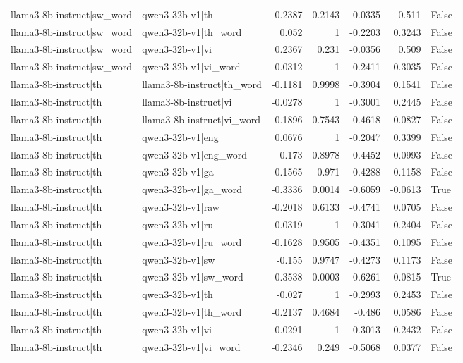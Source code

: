 \begin{table}
\begin{tabular}{l l r r r r l}
llama3-8b-instruct|sw_word & qwen3-32b-v1|th & 0.2387 & 0.2143 & -0.0335 & 0.511 & False \\
llama3-8b-instruct|sw_word & qwen3-32b-v1|th_word & 0.052 & 1 & -0.2203 & 0.3243 & False \\
llama3-8b-instruct|sw_word & qwen3-32b-v1|vi & 0.2367 & 0.231 & -0.0356 & 0.509 & False \\
llama3-8b-instruct|sw_word & qwen3-32b-v1|vi_word & 0.0312 & 1 & -0.2411 & 0.3035 & False \\
llama3-8b-instruct|th & llama3-8b-instruct|th_word & -0.1181 & 0.9998 & -0.3904 & 0.1541 & False \\
llama3-8b-instruct|th & llama3-8b-instruct|vi & -0.0278 & 1 & -0.3001 & 0.2445 & False \\
llama3-8b-instruct|th & llama3-8b-instruct|vi_word & -0.1896 & 0.7543 & -0.4618 & 0.0827 & False \\
llama3-8b-instruct|th & qwen3-32b-v1|eng & 0.0676 & 1 & -0.2047 & 0.3399 & False \\
llama3-8b-instruct|th & qwen3-32b-v1|eng_word & -0.173 & 0.8978 & -0.4452 & 0.0993 & False \\
llama3-8b-instruct|th & qwen3-32b-v1|ga & -0.1565 & 0.971 & -0.4288 & 0.1158 & False \\
llama3-8b-instruct|th & qwen3-32b-v1|ga_word & -0.3336 & 0.0014 & -0.6059 & -0.0613 & True \\
llama3-8b-instruct|th & qwen3-32b-v1|raw & -0.2018 & 0.6133 & -0.4741 & 0.0705 & False \\
llama3-8b-instruct|th & qwen3-32b-v1|ru & -0.0319 & 1 & -0.3041 & 0.2404 & False \\
llama3-8b-instruct|th & qwen3-32b-v1|ru_word & -0.1628 & 0.9505 & -0.4351 & 0.1095 & False \\
llama3-8b-instruct|th & qwen3-32b-v1|sw & -0.155 & 0.9747 & -0.4273 & 0.1173 & False \\
llama3-8b-instruct|th & qwen3-32b-v1|sw_word & -0.3538 & 0.0003 & -0.6261 & -0.0815 & True \\
llama3-8b-instruct|th & qwen3-32b-v1|th & -0.027 & 1 & -0.2993 & 0.2453 & False \\
llama3-8b-instruct|th & qwen3-32b-v1|th_word & -0.2137 & 0.4684 & -0.486 & 0.0586 & False \\
llama3-8b-instruct|th & qwen3-32b-v1|vi & -0.0291 & 1 & -0.3013 & 0.2432 & False \\
llama3-8b-instruct|th & qwen3-32b-v1|vi_word & -0.2346 & 0.249 & -0.5068 & 0.0377 & False \\

\end{tabular}
\end{table}
